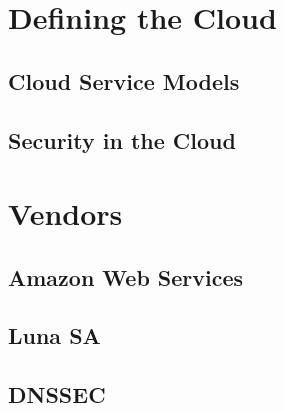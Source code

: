 \section{Defining the Cloud}
	\subsection{Cloud Service Models}

	\subsection{Security in the Cloud}

\section{Vendors}
	\subsection{Amazon Web Services}

	\subsection{Luna SA}

	\subsection{DNSSEC}
